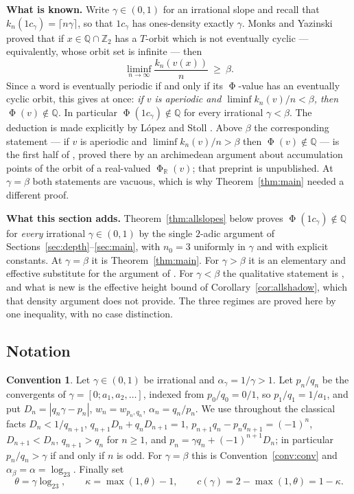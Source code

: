\documentclass[11pt,reqno]{amsart}
\theoremstyle{plain}
\theoremstyle{definition}
\newtheorem{convention}[theorem]{Convention}
\newcommand{\Zt}{\mathbb{Z}_2}
\newcommand{\Q}{\mathbb{Q}}
\newcommand{\R}{\mathbb{R}}
\DeclareMathOperator{\Ph}{\Phi}
\begin{document}
\medskip
\noindent\textbf{What is known.} Write $\gamma\in(0,1)$ for an irrational slope
and recall that $k_n(1c_\gamma)=\lceil n\gamma\rceil$, so that $1c_\gamma$ has
ones-density exactly $\gamma$. Monks and Yazinski
\cite[Theorem~2.7(b)]{MonksYazinski2004} proved that if $x\in\Q\cap\Zt$ has a
$T$-orbit which is not eventually cyclic --- equivalently, whose orbit set is
infinite --- then
\[
\liminf_{n\to\infty}\frac{k_n(v(x))}{n}\ \ge\ \beta .
\]
Since a word is eventually periodic if and only if its $\Ph$-value has an
eventually cyclic orbit, this gives at once: \emph{if $v$ is aperiodic and
$\liminf k_n(v)/n<\beta$, then $\Ph(v)\notin\Q$.} In particular
$\Ph(1c_\gamma)\notin\Q$ for every irrational $\gamma<\beta$. The deduction is
made explicitly by L\'opez and Stoll \cite[p.~6]{LopezStoll2021}. Above $\beta$
the corresponding statement --- if $v$ is aperiodic and $\liminf k_n(v)/n>\beta$
then $\Ph(v)\notin\Q$ --- is the first half of
\cite[Theorem~1]{LopezStoll2021}, proved there by an archimedean argument about
accumulation points of the orbit of a real-valued $\Ph_\R(v)$; that preprint is
unpublished. At $\gamma=\beta$ both statements are vacuous, which is why
Theorem~\ref{thm:main} needed a different proof.

\medskip
\noindent\textbf{What this section adds.} Theorem~\ref{thm:allslopes} below
proves $\Ph(1c_\gamma)\notin\Q$ for \emph{every} irrational $\gamma\in(0,1)$ by
the single $2$-adic argument of Sections~\ref{sec:depth}--\ref{sec:main}, with
$n_0=3$ uniformly in $\gamma$ and with explicit constants. At $\gamma=\beta$ it
is Theorem~\ref{thm:main}. For $\gamma>\beta$ it is an elementary and effective
substitute for the argument of \cite{LopezStoll2021}. For $\gamma<\beta$ the
qualitative statement is \cite{MonksYazinski2004}, and what is new is the
effective height bound of Corollary~\ref{cor:allshadow}, which that density
argument does not provide. The three regimes are proved here by one
inequality, with no case distinction.

\subsection*{Notation}

\begin{convention}\label{conv:gamma}
Let $\gamma\in(0,1)$ be irrational and $\alpha_\gamma=1/\gamma>1$. Let
$p_n/q_n$ be the convergents of $\gamma=[0;a_1,a_2,\dots]$, indexed from
$p_0/q_0=0/1$, so $p_1/q_1=1/a_1$, and put $D_n=|q_n\gamma-p_n|$,
$w_n=w_{p_n,q_n}$, $\alpha_n=q_n/p_n$. We use throughout the classical facts
$D_n<1/q_{n+1}$, $q_{n+1}D_n+q_nD_{n+1}=1$, $p_{n+1}q_n-p_nq_{n+1}=(-1)^n$,
$D_{n+1}<D_n$, $q_{n+1}>q_n$ for $n\ge1$, and
$p_n=\gamma q_n+(-1)^{n+1}D_n$; in particular $p_n/q_n>\gamma$ if and only if
$n$ is odd. For $\gamma=\beta$ this is Convention~\ref{conv:conv} and
$\alpha_\beta=\alpha=\log_23$. Finally set
\[
\theta=\gamma\log_23,\qquad \kappa=\max(1,\theta)-1,\qquad
c(\gamma)=2-\max(1,\theta)=1-\kappa .
\]
\end{convention}
\end{document}
